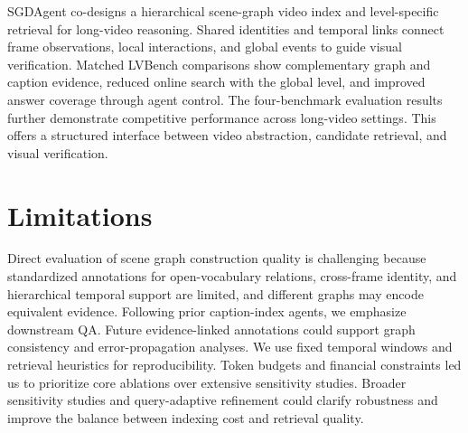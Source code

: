 \documentclass[11pt]{article}
\begin{document}
SGDAgent co-designs a hierarchical scene-graph video index and level-specific retrieval for long-video reasoning.
Shared identities and temporal links connect frame observations, local interactions, and global events to guide visual verification.
Matched LVBench comparisons show complementary graph and caption evidence, reduced online search with the global level, and improved answer coverage through agent control.
The four-benchmark evaluation results further demonstrate competitive performance across long-video settings.
This offers a structured interface between video abstraction, candidate retrieval, and visual verification.

\section*{Limitations}
Direct evaluation of scene graph construction quality is challenging because standardized annotations for open-vocabulary relations, cross-frame identity, and hierarchical temporal support are limited, and different graphs may encode equivalent evidence.
Following prior caption-index agents, we emphasize downstream QA.
Future evidence-linked annotations could support graph consistency and error-propagation analyses.
We use fixed temporal windows and retrieval heuristics for reproducibility.
Token budgets and financial constraints led us to prioritize core ablations over extensive sensitivity studies.
Broader sensitivity studies and query-adaptive refinement could clarify robustness and improve the balance between indexing cost and retrieval quality.





\clearpage
\appendix

\end{document}
